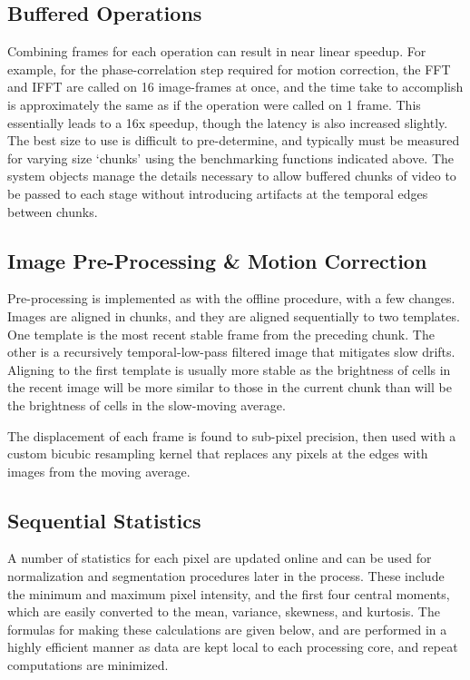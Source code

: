 \documentclass[../main.tex]{subfiles}
\begin{document}
\subsection{
	Buffered Operations}\label{buffered-operations}

Combining frames for each operation can result in near linear speedup.
For example, for the phase-correlation step required for motion correction, the FFT and IFFT are called on 16 image-frames at once, and the time take to accomplish is approximately the same as if the operation were called on 1 frame.
This essentially leads to a 16x speedup, though the latency is also increased slightly.
The best size to use is difficult to pre-determine, and typically must be measured for varying size `chunks' using the benchmarking functions indicated above.
The system objects manage the details necessary to allow buffered chunks of video to be passed to each stage without introducing artifacts at the temporal edges between chunks.

\subsection{
	Image Pre-Processing \& Motion Correction}\label{image-pre-processing-motion-correction}

Pre-processing is implemented as with the offline procedure, with a few changes.
Images are aligned in chunks, and they are aligned sequentially to two templates.
One template is the most recent stable frame from the preceding chunk.
The other is a recursively temporal-low-pass filtered image that mitigates slow drifts.
Aligning to the first template is usually more stable as the brightness of cells in the recent image will be more similar to those in the current chunk than will be the brightness of cells in the slow-moving average.

The displacement of each frame is found to sub-pixel precision, then used with a custom bicubic resampling kernel that replaces any pixels at the edges with images from the moving average.

\subsection{
	Sequential Statistics}\label{sequential-statistics}

A number of statistics for each pixel are updated online and can be used for normalization and segmentation procedures later in the process.
These include the minimum and maximum pixel intensity, and the first four central moments, which are easily converted to the mean, variance, skewness, and kurtosis.
The formulas for making these calculations are given below, and are performed in a highly efficient manner as data are kept local to each processing core, and repeat computations are minimized.
\end{document}
